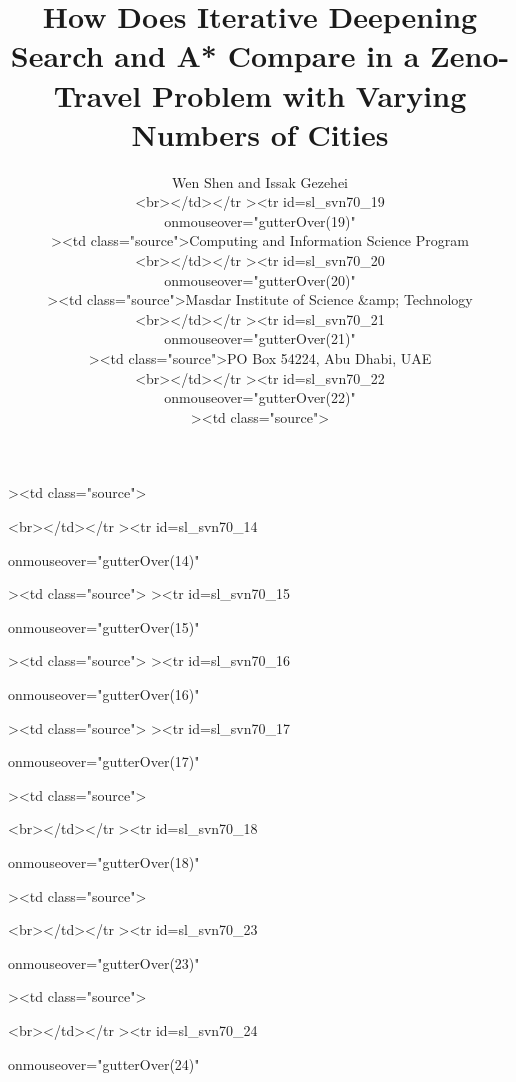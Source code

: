 ><td class="source">\documentclass[letterpaper]{article}<br></td></tr
\begin{document}
<br></td></tr
><tr
id=sl_svn70_14

 onmouseover="gutterOver(14)"

><td class="source">%
><tr
id=sl_svn70_15

 onmouseover="gutterOver(15)"

><td class="source">%
><tr
id=sl_svn70_16

 onmouseover="gutterOver(16)"

><td class="source">%
><tr
id=sl_svn70_17

 onmouseover="gutterOver(17)"

><td class="source">\title{How Does Iterative Deepening Search and A* Compare in a Zeno-Travel Problem with Varying Numbers of Cities}<br></td></tr
><tr
id=sl_svn70_18

 onmouseover="gutterOver(18)"

><td class="source">\author{Wen Shen and Issak Gezehei \\<br></td></tr
><tr
id=sl_svn70_19

 onmouseover="gutterOver(19)"

><td class="source">Computing and Information Science Program\\<br></td></tr
><tr
id=sl_svn70_20

 onmouseover="gutterOver(20)"

><td class="source">Masdar Institute of Science \&amp; Technology\\<br></td></tr
><tr
id=sl_svn70_21

 onmouseover="gutterOver(21)"

><td class="source">PO Box 54224, Abu Dhabi, UAE\\<br></td></tr
><tr
id=sl_svn70_22

 onmouseover="gutterOver(22)"

><td class="source">}<br></td></tr
><tr
id=sl_svn70_23

 onmouseover="gutterOver(23)"

><td class="source">\maketitle<br></td></tr
><tr
id=sl_svn70_24

 onmouseover="gutterOver(24)"
\end{document}
